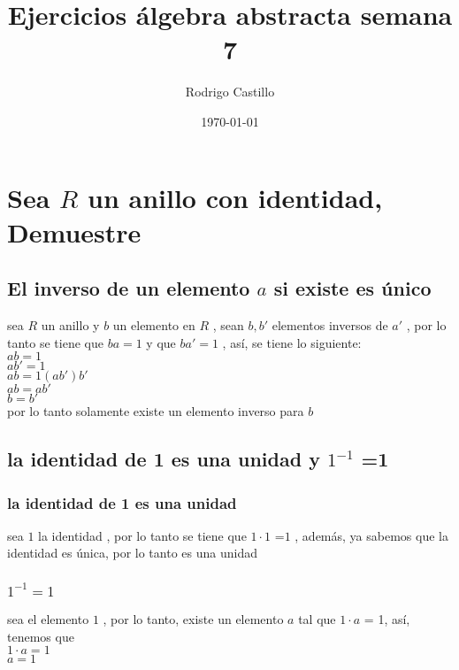 \documentclass[10pt,a4paper]{article} %
\begin{document}
    \title{{  Ejercicios álgebra abstracta semana 7  }}
    \author{{Rodrigo Castillo}}
    \date{\today}

    \maketitle


    \section{Sea $ R  $ un anillo con identidad, Demuestre}

        \subsection{El inverso de un elemento $ a  $ si existe es único}

            sea $ R  $ un anillo y $ b  $ un elemento en $ R  $ , sean $ b, b'
            $ elementos inversos de $ a '  $ , por lo tanto se tiene que $
            ba = 1  $ y que $ ba'  = 1 $ , así, se tiene lo siguiente:
            \\
            $ ab = 1  $
            \\
            $ ab' = 1  $
            \\
            $ ab = 1(ab') b' $
            \\
            $ ab = ab'  $
            \\
            $ b = b'  $
            \\
            por lo tanto solamente existe un elemento inverso para $ b  $

        \subsection{la identidad de 1 es una unidad y $ 1 ^{-1}  $  =1  }

            \subsubsection{la identidad de 1 es una unidad}
                sea $ 1  $ la identidad , por lo tanto se tiene que $ 1 \cdot 1
                $ =$ 1  $ , además, ya sabemos que la identidad es única, por
                lo tanto es una unidad
            \subsubsection{ $ 1 ^{-1} =1  $  }
                sea el elemento $ 1  $ , por lo tanto, existe un elemento $ a
                $ tal que $ 1 \cdot a  $  = 1, así, tenemos que
                \\
                $ 1 \cdot a = 1  $
                \\
                $ a = 1  $
\end{document}
